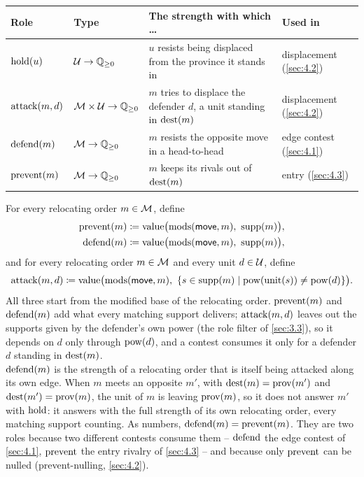 \documentclass[12pt,a4paper]{article}
\begin{document}
\begingroup\small
\begin{tabularx}{\textwidth}{@{}l l >{\raggedright\arraybackslash}X l@{}}
\toprule
Role & Type & The strength with which \ldots & Used in \\
\midrule
$\operatorname{hold}(u)$ & $\mathcal{U} \to \mathbb{Q}_{\ge 0}$ & $u$ resists being displaced from the province it stands in & displacement (\cref{sec:4.2}) \\
$\operatorname{attack}(m, d)$ & $\mathcal{M} \times \mathcal{U} \to \mathbb{Q}_{\ge 0}$ & $m$ tries to displace the defender $d$, a unit standing in $\operatorname{dest}(m)$ & displacement (\cref{sec:4.2}) \\
$\operatorname{defend}(m)$ & $\mathcal{M} \to \mathbb{Q}_{\ge 0}$ & $m$ resists the opposite move in a head-to-head & edge contest (\cref{sec:4.1}) \\
$\operatorname{prevent}(m)$ & $\mathcal{M} \to \mathbb{Q}_{\ge 0}$ & $m$ keeps its rivals out of $\operatorname{dest}(m)$ & entry (\cref{sec:4.3}) \\
\bottomrule
\end{tabularx}
\endgroup

For every relocating order $m \in \mathcal{M}$, define
\begin{align*}
\prevent(m) &\coloneqq \val\bigl(\mods(\role{move}, m),\ \supp(m)\bigr), \\
\defend(m) &\coloneqq \val\bigl(\mods(\role{move}, m),\ \supp(m)\bigr),
\end{align*}
and for every relocating order $m \in \mathcal{M}$ and every unit $d \in \mathcal{U}$, define
\[
\operatorname{attack}(m, d) \coloneqq \operatorname{value}\bigl(\operatorname{mods}(\mathsf{move}, m),\ \{ s \in \operatorname{supp}(m) \mid \operatorname{pow}(\operatorname{unit}(s)) \ne \operatorname{pow}(d) \}\bigr).
\]
All three start from the modified base of the relocating order.
$\operatorname{prevent}(m)$ and $\operatorname{defend}(m)$ add what every matching support delivers; $\operatorname{attack}(m, d)$ leaves out the supports given by the defender's own power (the role filter of \cref{sec:3.3}), so it depends on $d$ only through $\operatorname{pow}(d)$, and a contest consumes it only for a defender $d$ standing in $\operatorname{dest}(m)$.\\
$\operatorname{defend}(m)$ is the strength of a relocating order that is itself being attacked along its own edge.
When $m$ meets an opposite $m'$, with $\operatorname{dest}(m) = \operatorname{prov}(m')$ and $\operatorname{dest}(m') = \operatorname{prov}(m)$, the unit of $m$ is leaving $\operatorname{prov}(m)$, so it does not answer $m'$ with $\operatorname{hold}$: it answers with the full strength of its own relocating order, every matching support counting.
As numbers, $\operatorname{defend}(m) = \operatorname{prevent}(m)$.
They are two roles because two different contests consume them -- $\operatorname{defend}$ the edge contest of \cref{sec:4.1}, $\operatorname{prevent}$ the entry rivalry of \cref{sec:4.3} -- and because only $\operatorname{prevent}$ can be nulled (prevent-nulling, \cref{sec:4.2}).
\end{document}

